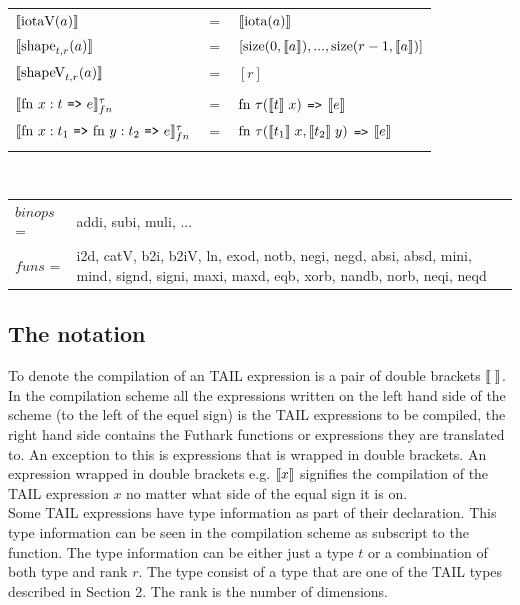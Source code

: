 \documentclass[11pt]{article}
\begin{document}
\begin{tabular}{l c l}
$\llbracket \text{iotaV}(a) \rrbracket$ & $=$ & $\llbracket \text{iota}(a) \rrbracket$\\

$\llbracket \text{shape}_{t,r}(a) \rrbracket$ & $=$ & $[\text{size}(0,\llbracket a \rrbracket),...,\text{size}(r-1,\llbracket a \rrbracket)]$\\

$\llbracket \text{shapeV}_{t,r}(a) \rrbracket$ & $=$ & $[r]$\\
\\

$\evals{ \text{fn } x:t $ {\tt =>} $ e}^{\tau}_{fn} $ & $=$ & $ \text{fn } \tau (\llbracket t \rrbracket\; x) $ {\tt =>} $ \llbracket e \rrbracket$\\
$\evals{ \text{fn } x:t_1$ {\tt =>} $\text{fn } y:t_2 $ {\tt =>} $ e}^{\tau}_{fn} $ & $=$ & $ \text{fn } \tau (\llbracket t_1 \rrbracket\; x, \llbracket t_2 \rrbracket \; y) $ {\tt =>} $ \llbracket e \rrbracket$\\
\\
\end{tabular}\\

\begin{tabu} to \linewidth { l X}
$binops$ =& addi, subi, muli, ...\\
$funs$ =& i2d, catV, b2i, b2iV, ln, exod, notb, negi, negd, absi, absd, mini, mind, signd, signi, maxi, maxd, eqb, xorb,
nandb, norb, neqi, neqd
\end{tabu}

\subsection{The notation}
To denote the compilation of an TAIL expression is a pair of double brackets $\llbracket  \;  \rrbracket$. 
In the compilation scheme all the expressions written on the left hand side of the scheme (to the left of the equel sign) is the TAIL expressions to be compiled, the right hand side contains the Futhark functions or expressions they are translated to. An exception to this is expressions that is wrapped in double brackets.
An expression wrapped in double brackets e.g. $\llbracket x \rrbracket$ signifies the compilation of the TAIL expression $x$ no matter what side of the equal sign it is on.\\

Some TAIL expressions have type information as part of their declaration. This type information can be seen in the
compilation scheme as subscript to the function. The type information can be either just a type $t$ or a combination of both type and rank $r$. The type consist of a type that are one of the TAIL
types described in Section 2. The rank is the number of dimensions.  \\
\end{document}
